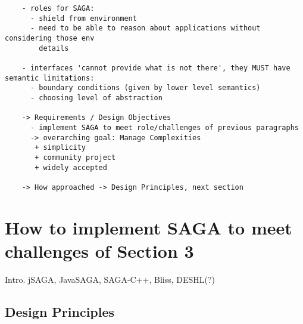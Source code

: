 \documentclass[a4paper,10pt]{article}
\begin{document}
  \begin{verbatim}
    - roles for SAGA: 
      - shield from environment
      - need to be able to reason about applications without considering those env
        details

    - interfaces 'cannot provide what is not there', they MUST have semantic limitations:
      - boundary conditions (given by lower level semantics)
      - choosing level of abstraction

    -> Requirements / Design Objectives
      - implement SAGA to meet role/challenges of previous paragraphs
      -> overarching goal: Manage Complexities
       + simplicity
       + community project
       + widely accepted

    -> How approached -> Design Principles, next section

  \end{verbatim}


\section{How to implement SAGA to meet challenges of Section 3}
\label{saga_impls}

 Intro. jSAGA, JavaSAGA, SAGA-C++, Bliss, DESHL(?)

 \subsection{Design Principles}
\end{document}

